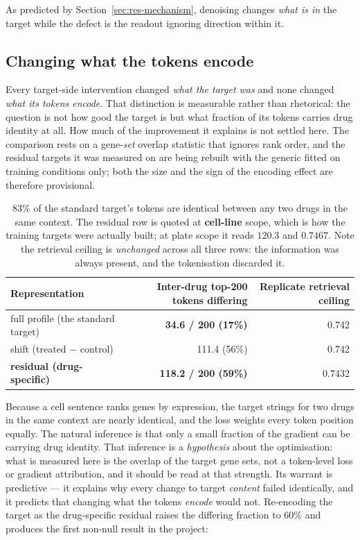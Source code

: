 As predicted by Section~\ref{sec:res-mechanism}, denoising changes \emph{what is in} the target
while the defect is the readout ignoring direction within it.

\subsection{Changing what the tokens encode}
\label{sec:res-encoding}

Every target-side intervention changed \emph{what the target was} and none changed \emph{what its
tokens encode}. That distinction is measurable rather than rhetorical: the question is not how good
the target is but what fraction of its tokens carries drug identity at all. How much of the
improvement it explains is not settled here. The comparison rests on a gene-\emph{set} overlap
statistic that ignores rank order, and the residual targets it was measured on are being rebuilt
with the generic fitted on training conditions only; both the size and the sign of the encoding
effect are therefore provisional.

\begin{table}[h]
\centering
\begin{tabular}{lrr}
\toprule
Representation & Inter-drug top-200 tokens differing & Replicate retrieval ceiling \\
\midrule
full profile (the standard target) & \textbf{34.6 / 200 (17\%)} & 0.742 \\
shift (treated $-$ control) & 111.4 (56\%) & 0.742 \\
\textbf{residual (drug-specific)} & \textbf{118.2 / 200 (59\%)} & 0.7432 \\
\bottomrule
\end{tabular}
\caption{$83\%$ of the standard target's tokens are identical between any two drugs in the same
context. The residual row is quoted at \textbf{cell-line} scope, which is how the training targets
were actually built; at plate scope it reads $120.3$ and $0.7467$. Note the retrieval ceiling is
\emph{unchanged} across all three rows: the information was always present, and the tokenisation
discarded it.}
\label{tab:divergence}
\end{table}

Because a cell sentence ranks genes by expression, the target strings for two drugs in the same
context are nearly identical, and the loss weights every token position equally. The natural
inference is that only a small fraction of the gradient can be carrying drug identity. That inference
is a \emph{hypothesis} about the optimisation: what is measured here is the overlap of the target
gene sets, not a token-level loss or gradient attribution, and it should be read at that strength.
Its warrant is predictive --- it explains why every change to target \emph{content} failed
identically, and it predicts that changing what the tokens \emph{encode} would not. Re-encoding the target as the drug-specific residual raises the differing fraction to
$60\%$ and produces the first non-null result in the project:

